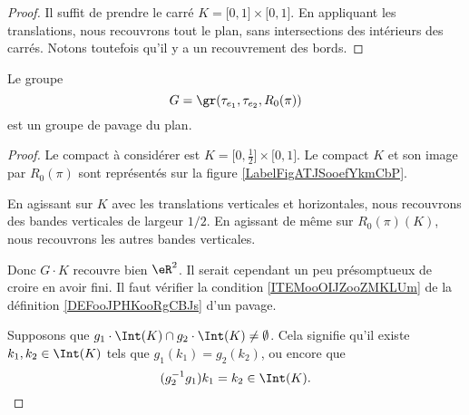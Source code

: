 \begin{proof}
    Il suffit de prendre le carré \( K=\mathopen[ 0 , 1 \mathclose]\times \mathopen[ 0 , 1 \mathclose]\). En appliquant les translations, nous recouvrons tout le plan, sans intersections des intérieurs des carrés. Notons toutefois qu'il y a un recouvrement des bords.
\end{proof}

\begin{lemma}    \label{LEMooTMRGooChBzZg}
    Le groupe 
    \begin{equation}
        G=\gr(\tau_{e_1}, \tau_{e_2}, R_0(\pi))
    \end{equation}
    est un groupe de pavage du plan.
\end{lemma}

\begin{proof}
    Le compact à considérer est \( K=\mathopen[ 0 , \frac{ 1 }{2} \mathclose]\times \mathopen[ 0 , 1 \mathclose]\). Le compact \( K\) et son image par \( R_0(\pi)\) sont représentés sur la figure \ref{LabelFigATJSooefYkmCbP}. %

    En agissant sur \( K\) avec les translations verticales et horizontales, nous recouvrons des bandes verticales de largeur \( 1/2\). En agissant de même sur \( R_0(\pi)(K) \), nous recouvrons les autres bandes verticales.

    Donc \( G\cdot K\) recouvre bien \( \eR^2\). Il serait cependant un peu présomptueux de croire en avoir fini. Il faut vérifier la condition \ref{ITEMooOIJZooZMKLUm} de la définition \ref{DEFooJPHKooRgCBJs} d'un pavage.

    Supposons que \( g_1\cdot\Int(K)\cap g_2\cdot \Int(K)\neq \emptyset\). Cela signifie qu'il existe \( k_1,k_2\in \Int(K)\) tels que \( g_1(k_1)=g_2(k_2)\), ou encore que
    \begin{equation}        \label{EQooITJEooUkUKuu}
        (g_2^{-1}g_1)k_1=k_2\in \Int(K).
    \end{equation}


\end{proof}
